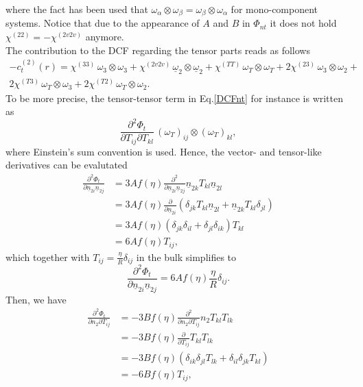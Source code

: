 \documentclass{article}
\begin{document}
where the fact has been used that $\omega_\alpha\otimes\omega_\beta=\omega_\beta\otimes\omega_\alpha$ for mono-component systems. Notice that due to the appearance of $A$ and $B$ in $\Phi_{nt}$ it does not hold $\chi^{(22)}=-\chi^{(2v2v)}$ anymore.\\
The contribution to the DCF regarding the tensor parts reads as follows
\begin{gather}\label{DCFt}
	-c^{(2)}_{t}(r) = \chi^{(33)}\,\omega_3\otimes\omega_3 + \chi^{(2v2v)}\,\underline{\omega}_2\otimes\underline{\omega}_2 + \chi^{(TT)}\,\omega_T\otimes\omega_T + 2\chi^{(23)}\,\omega_3\otimes\omega_2+\\\nonumber
	 2\chi^{(T3)}\,\omega_T\otimes\omega_3 + 2\chi^{(T2)}\,\omega_T\otimes\omega_2.
\end{gather}
To be more precise, the tensor-tensor term in Eq.\eqref{DCFnt} for instance is written as
\begin{equation}
	\frac{\partial^2\Phi_{t}}{\partial T_{ij}\partial T_{kl}}\,(\omega_T)_{ij}\otimes(\omega_T)_{kl},
\end{equation}
where Einstein's sum convention is used. Hence, the vector- and tensor-like derivatives can be evalutated
\begin{align}
	\frac{\partial^2\Phi_{t}}{\partial \underline{n}_{2i}\underline{n}_{2j}} &= 3Af(\eta)\frac{\partial^2}{\partial \underline{n}_{2i}\underline{n}_{2j}}\underline{n}_{2k}T_{kl}\underline{n}_{2l}\\\nonumber
	&=3Af(\eta)\frac{\partial}{\partial \underline{n}_{2i}}\left(\delta_{jk}T_{kl}\underline{n}_{2l}+\underline{n}_{2k}T_{kl}\delta_{jl}\right)\\\nonumber
	&= 3Af(\eta)\left(\delta_{jk}\delta_{il} + \delta_{jl}\delta_{ik}\right)T_{kl}\\\nonumber
	&= 6Af(\eta)T_{ij},
\end{align}
which together with $T_{ij} = \frac{\eta}{R}\delta_{ij}$ in the bulk simplifies to
\begin{equation}
	\frac{\partial^2\Phi_{t}}{\partial \underline{n}_{2i}\underline{n}_{2j}} = 6Af(\eta)\frac{\eta}{R}\delta_{ij}.
\end{equation}
Then, we have 
\begin{align}
	\frac{\partial^2\Phi_{t}}{\partial n_2\partial T_{ij}} &= -3Bf(\eta)\frac{\partial^2}{\partial n_2\partial T_{ij}}n_2 T_{kl}T_{lk}\\\nonumber
	&= -3Bf(\eta)\frac{\partial}{\partial T_{ij}}T_{kl}T_{lk}\\\nonumber
	&= -3Bf(\eta)\left(\delta_{ik}\delta_{jl}T_{lk}+\delta_{il}\delta_{jk}T_{kl}\right)\\\nonumber
	&= -6Bf(\eta)T_{ij},
\end{align}
\end{document}
